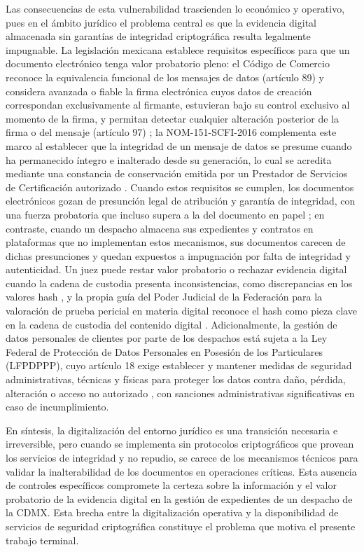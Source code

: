 Las consecuencias de esta vulnerabilidad trascienden lo económico y operativo, pues en el ámbito jurídico el problema central es que la evidencia digital almacenada sin garantías de integridad criptográfica resulta legalmente impugnable. La legislación mexicana establece requisitos específicos para que un documento electrónico tenga valor probatorio pleno: el Código de Comercio reconoce la equivalencia funcional de los mensajes de datos (artículo 89) y considera avanzada o fiable la firma electrónica cuyos datos de creación correspondan exclusivamente al firmante, estuvieran bajo su control exclusivo al momento de la firma, y permitan detectar cualquier alteración posterior de la firma o del mensaje (artículo 97) \cite{ccom2018}; la NOM-151-SCFI-2016 complementa este marco al establecer que la integridad de un mensaje de datos se presume cuando ha permanecido íntegro e inalterado desde su generación, lo cual se acredita mediante una constancia de conservación emitida por un Prestador de Servicios de Certificación autorizado \cite{nom151_2016}. Cuando estos requisitos se cumplen, los documentos electrónicos gozan de presunción legal de atribución y garantía de integridad, con una fuerza probatoria que incluso supera a la del documento en papel \cite{mifiel_prueba2025}; en contraste, cuando un despacho almacena sus expedientes y contratos en plataformas que no implementan estos mecanismos, sus documentos carecen de dichas presunciones y quedan expuestos a impugnación por falta de integridad y autenticidad. Un juez puede restar valor probatorio o rechazar evidencia digital cuando la cadena de custodia presenta inconsistencias, como discrepancias en los valores hash \cite{ubt2025}, y la propia guía del Poder Judicial de la Federación para la valoración de prueba pericial en materia digital reconoce el hash como pieza clave en la cadena de custodia del contenido digital \cite{pjf_video}. Adicionalmente, la gestión de datos personales de clientes por parte de los despachos está sujeta a la Ley Federal de Protección de Datos Personales en Posesión de los Particulares (LFPDPPP), cuyo artículo 18 exige establecer y mantener medidas de seguridad administrativas, técnicas y físicas para proteger los datos contra daño, pérdida, alteración o acceso no autorizado \cite{lfpdppp2025}, con sanciones administrativas significativas en caso de incumplimiento.

En síntesis, la digitalización del entorno jurídico es una transición necesaria e irreversible, pero cuando se implementa sin protocolos criptográficos que provean los servicios de integridad y no repudio, se carece de los mecanismos técnicos para validar la inalterabilidad de los documentos en operaciones críticas. Esta ausencia de controles específicos compromete la certeza sobre la información y el valor probatorio de la evidencia digital en la gestión de expedientes de un despacho de la CDMX. Esta brecha entre la digitalización operativa y la disponibilidad de servicios de seguridad criptográfica constituye el problema que motiva el presente trabajo terminal.

